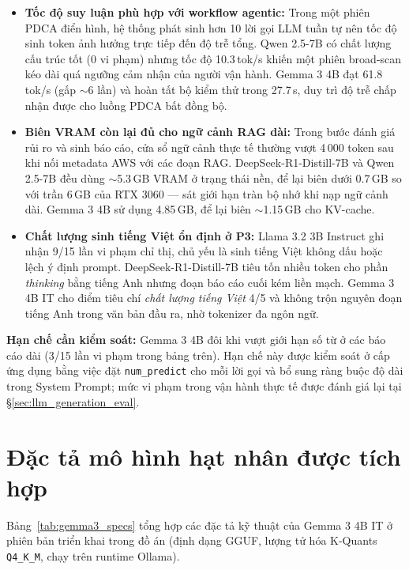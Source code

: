 \begin{itemize}
    \item \textbf{Tốc độ suy luận phù hợp với workflow agentic:} Trong một phiên PDCA điển hình, hệ thống phát sinh hơn 10 lời gọi LLM tuần tự nên tốc độ sinh token ảnh hưởng trực tiếp đến độ trễ tổng. Qwen 2.5-7B có chất lượng cấu trúc tốt (0 vi phạm) nhưng tốc độ 10.3\,tok/s khiến một phiên broad-scan kéo dài quá ngưỡng cảm nhận của người vận hành. Gemma 3 4B đạt 61.8\,tok/s (gấp $\sim$6 lần) và hoàn tất bộ kiểm thử trong 27.7\,s, duy trì độ trễ chấp nhận được cho luồng PDCA bất đồng bộ.

    \item \textbf{Biên VRAM còn lại đủ cho ngữ cảnh RAG dài:} Trong bước đánh giá rủi ro và sinh báo cáo, cửa sổ ngữ cảnh thực tế thường vượt 4\,000 token sau khi nối metadata AWS với các đoạn RAG. DeepSeek-R1-Distill-7B và Qwen 2.5-7B đều dùng $\sim$5.3\,GB VRAM ở trạng thái nền, để lại biên dưới 0.7\,GB so với trần 6\,GB của RTX 3060 --- sát giới hạn tràn bộ nhớ khi nạp ngữ cảnh dài. Gemma 3 4B sử dụng 4.85\,GB, để lại biên $\sim$1.15\,GB cho KV-cache.

    \item \textbf{Chất lượng sinh tiếng Việt ổn định ở P3:} Llama 3.2 3B Instruct ghi nhận 9/15 lần vi phạm chỉ thị, chủ yếu là sinh tiếng Việt không dấu hoặc lệch ý định prompt. DeepSeek-R1-Distill-7B tiêu tốn nhiều token cho phần \textit{thinking} bằng tiếng Anh nhưng đoạn báo cáo cuối kém liền mạch. Gemma 3 4B IT cho điểm tiêu chí \textit{chất lượng tiếng Việt} 4/5 và không trộn nguyên đoạn tiếng Anh trong văn bản đầu ra, nhờ tokenizer đa ngôn ngữ.
\end{itemize}

\textbf{Hạn chế cần kiểm soát:} Gemma 3 4B đôi khi vượt giới hạn số từ ở các báo cáo dài (3/15 lần vi phạm trong bảng trên). Hạn chế này được kiểm soát ở cấp ứng dụng bằng việc đặt \texttt{num\_predict} cho mỗi lời gọi và bổ sung ràng buộc độ dài trong System Prompt; mức vi phạm trong vận hành thực tế được đánh giá lại tại §\ref{sec:llm_generation_eval}.

\section{Đặc tả mô hình hạt nhân được tích hợp}
\label{app:model_benchmark_gemma_spec}

Bảng~\ref{tab:gemma3_specs} tổng hợp các đặc tả kỹ thuật của Gemma 3 4B IT ở phiên bản triển khai trong đồ án (định dạng GGUF, lượng tử hóa K-Quants \texttt{Q4\_K\_M}, chạy trên runtime Ollama).

